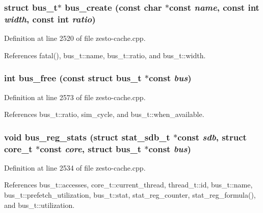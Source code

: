 \subsubsection[{bus\_\-create}]{\setlength{\rightskip}{0pt plus 5cm}struct {\bf bus\_\-t}$\ast$ bus\_\-create (const char $\ast$const  {\em name}, \/  const int {\em width}, \/  const int {\em ratio})\hspace{0.3cm}{\tt  [read]}}\label{zesto-cache_8cpp_cf58fdfdf1939cc2b0b05b50ac0eedd8}




Definition at line 2520 of file zesto-cache.cpp.

References fatal(), bus\_\-t::name, bus\_\-t::ratio, and bus\_\-t::width.
\subsubsection[{bus\_\-free}]{\setlength{\rightskip}{0pt plus 5cm}int bus\_\-free (const struct {\bf bus\_\-t} $\ast$const  {\em bus})}\label{zesto-cache_8cpp_24292dcf41327971f03a4c7150cbdf28}




Definition at line 2573 of file zesto-cache.cpp.

References bus\_\-t::ratio, sim\_\-cycle, and bus\_\-t::when\_\-available.
\subsubsection[{bus\_\-reg\_\-stats}]{\setlength{\rightskip}{0pt plus 5cm}void bus\_\-reg\_\-stats (struct {\bf stat\_\-sdb\_\-t} $\ast$const  {\em sdb}, \/  struct {\bf core\_\-t} $\ast$const  {\em core}, \/  struct {\bf bus\_\-t} $\ast$const  {\em bus})}\label{zesto-cache_8cpp_22d7e9c4a1a2031601e5a3ad3694768c}




Definition at line 2534 of file zesto-cache.cpp.

References bus\_\-t::accesses, core\_\-t::current\_\-thread, thread\_\-t::id, bus\_\-t::name, bus\_\-t::prefetch\_\-utilization, bus\_\-t::stat, stat\_\-reg\_\-counter, stat\_\-reg\_\-formula(), and bus\_\-t::utilization.
